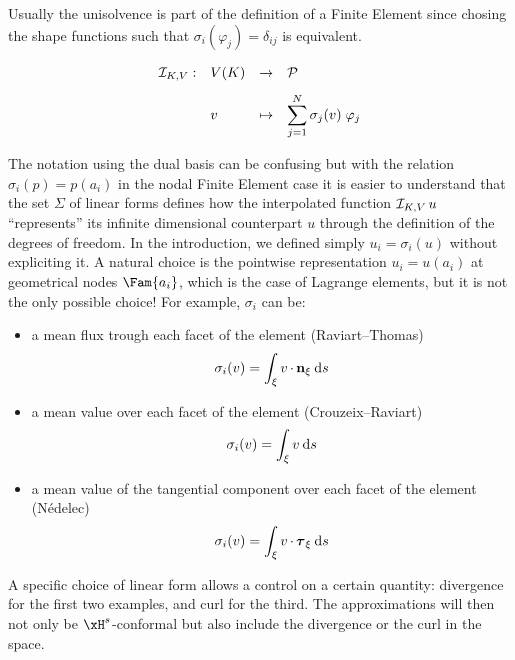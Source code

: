 \medskip
Usually the unisolvence is part of the definition of a Finite Element since chosing the shape functions such that $\sigma_i(\varphi_j) = \delta_{ij}$ is equivalent.

\begin{dfntn}
\begin{equation*}
\begin{array}{llll}
\IopK{\xV}: & \xV(K) & \fromto & \SpaceP\\[2ex]
\hfill    & v    & \mapsto & \displaystyle\sum_{j=1}^{N} \sigma_j(v)\; \varphi_j
\end{array}
\end{equation*}
\end{dfntn}

\begin{rmrk}
The notation using the dual basis can be confusing but with the relation $\sigma_i(p) = p(a_i)$ in the nodal Finite Element case it is easier to understand that the set $\Sigma$ of linear forms defines how the interpolated function $\mathop{\mathcal{I}_{K,{V}}}u$ ``represents'' its infinite dimensional counterpart $u$ through the definition of the degrees of freedom.
In the introduction, we defined simply $u_i = \sigma_i(u)$ without expliciting it. A natural choice is the pointwise representation $u_i = u(a_i)$ at geometrical nodes $\Fam{a_i}$, which is the case of Lagrange elements, but it is not the only possible choice!
For example, $\sigma_i$ can be:
\begin{itemize}
\item a mean flux trough each facet of the element (Raviart--Thomas)
\begin{equation*}
\sigma_i(v) = \int_\xi v\,{\mathbf\cdot}\,\mathbf n_\xi\hspace{.5ex}{\mathrm d}s
\end{equation*}
\item a mean value over each facet of the element (Crouzeix--Raviart)
\begin{equation*}
\sigma_i(v) = \int_\xi v\hspace{.5ex}{\mathrm d}s
\end{equation*}
\item a mean value of the tangential component over each facet of the element (Nédelec)
\begin{equation*}
\sigma_i(v) = \int_\xi v\,{\mathbf\cdot}\,\boldsymbol\tau_\xi\hspace{.5ex}{\mathrm d}s
\end{equation*}
\end{itemize}
A specific choice of linear form allows a control on a certain quantity: divergence for the first two examples, and curl for the third.
The approximations will then not only be $\xH^s$-conformal but also include the divergence or the curl in the space.
\end{rmrk}

